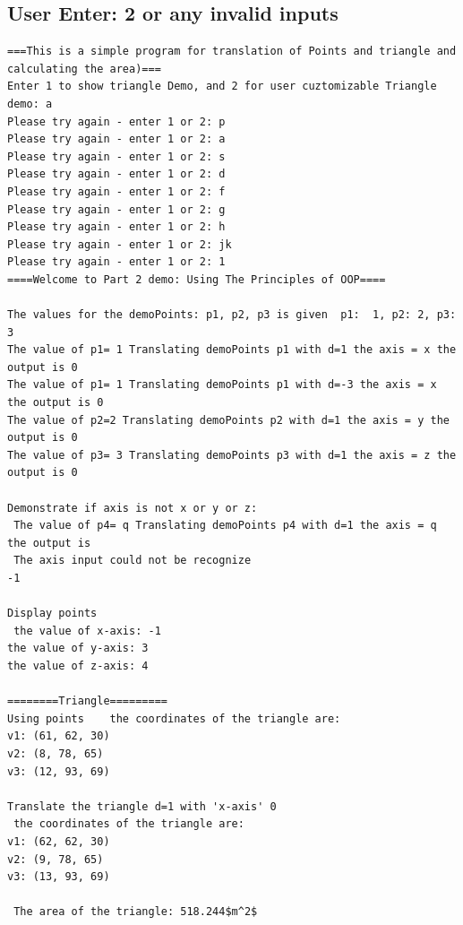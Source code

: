 \documentclass{article}
\begin{document}
\subsection{User Enter: 2 or any invalid inputs}
\begin{lstlisting}[language={}]
===This is a simple program for translation of Points and triangle and calculating the area)===
Enter 1 to show triangle Demo, and 2 for user cuztomizable Triangle demo: a
Please try again - enter 1 or 2: p
Please try again - enter 1 or 2: a
Please try again - enter 1 or 2: s
Please try again - enter 1 or 2: d
Please try again - enter 1 or 2: f
Please try again - enter 1 or 2: g
Please try again - enter 1 or 2: h
Please try again - enter 1 or 2: jk
Please try again - enter 1 or 2: 1
====Welcome to Part 2 demo: Using The Principles of OOP====

The values for the demoPoints: p1, p2, p3 is given  p1:  1, p2: 2, p3: 3
The value of p1= 1 Translating demoPoints p1 with d=1 the axis = x the output is 0
The value of p1= 1 Translating demoPoints p1 with d=-3 the axis = x the output is 0
The value of p2=2 Translating demoPoints p2 with d=1 the axis = y the output is 0
The value of p3= 3 Translating demoPoints p3 with d=1 the axis = z the output is 0

Demonstrate if axis is not x or y or z:
 The value of p4= q Translating demoPoints p4 with d=1 the axis = q the output is
 The axis input could not be recognize
-1

Display points
 the value of x-axis: -1
the value of y-axis: 3
the value of z-axis: 4

========Triangle=========
Using points    the coordinates of the triangle are:
v1: (61, 62, 30)
v2: (8, 78, 65)
v3: (12, 93, 69)

Translate the triangle d=1 with 'x-axis' 0
 the coordinates of the triangle are:
v1: (62, 62, 30)
v2: (9, 78, 65)
v3: (13, 93, 69)

 The area of the triangle: 518.244$m^2$


\end{lstlisting}
\end{document}
